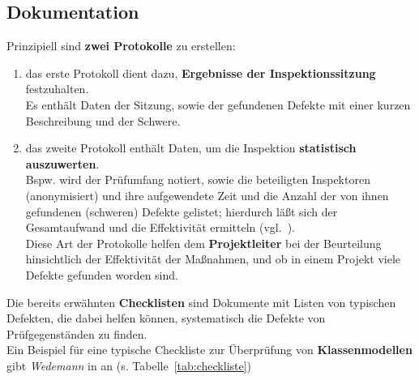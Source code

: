 \subsection{Dokumentation}
Prinzipiell sind \textbf{zwei Protokolle} zu erstellen:

\begin{enumerate}
    \item das erste Protokoll dient dazu, \textbf{Ergebnisse der Inspektionssitzung} festzuhalten.\\
    Es enthält Daten der Sitzung, sowie der gefundenen Defekte mit einer kurzen Beschreibung und der Schwere.
    \item das zweite Protokoll enthält Daten, um die Inspektion \textbf{statistisch auszuwerten}. \\
    Bspw. wird der Prüfumfang notiert, sowie die beteiligten Inspektoren (anonymisiert) und ihre aufgewendete Zeit und die Anzahl der von ihnen gefundenen (schweren) Defekte gelistet; hierdurch läßt sich der Gesamtaufwand und die Effektivität ermitteln (vgl.~\cite[Abb. 3.2, 22]{Wed09c}).\\
    Diese Art der Protokolle helfen dem \textbf{Projektleiter} bei der Beurteilung hinsichtlich der Effektivität der Maßnahmen, und ob in einem Projekt viele Defekte gefunden worden sind.
\end{enumerate}

\noindent
Die bereits erwähnten \textbf{Checklisten} sind Dokumente mit Listen von typischen Defekten, die dabei helfen können, systematisch die Defekte von Prüfgegenständen zu finden.\\
Ein Beispiel für eine typische Checkliste zur Überprüfung von \textbf{Klassenmodellen} gibt \textit{Wedemann} in \cite[Abb. 3.3, 23]{Wed09c} an (s. Tabelle~\ref{tab:checkliste})

